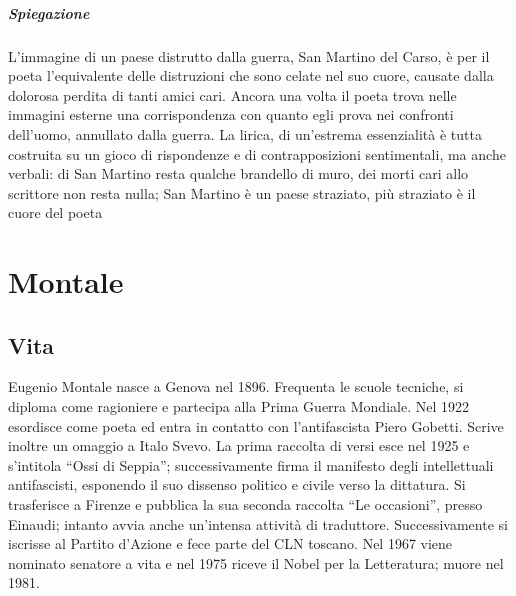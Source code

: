 \documentclass[10pt]{report}
\begin{document}
		\subparagraph[San Martino del carso]{Spiegazione} L’immagine di un paese distrutto dalla guerra, San Martino del Carso, è per il poeta l’equivalente delle distruzioni che sono celate nel suo cuore, causate dalla dolorosa perdita di tanti amici cari. Ancora una volta il poeta trova nelle immagini esterne una corrispondenza con quanto egli prova nei confronti dell’uomo, annullato dalla guerra. La lirica, di un’estrema essenzialità è tutta costruita su un gioco di rispondenze e di contrapposizioni sentimentali, ma anche verbali: di San Martino resta qualche brandello di muro, dei morti cari allo scrittore non resta nulla; San Martino è un paese straziato, più straziato è il cuore del poeta
		
		
		
		
		
		
	
		\section{Montale}
		\subsection{Vita}
		Eugenio Montale nasce a Genova nel 1896. Frequenta le scuole tecniche, si diploma come ragioniere e partecipa alla Prima Guerra Mondiale. Nel 1922 esordisce come poeta ed entra in contatto con l’antifascista Piero Gobetti. Scrive inoltre un omaggio a Italo Svevo. La prima raccolta di versi esce nel 1925 e s’intitola “Ossi di Seppia”; successivamente firma il manifesto degli intellettuali antifascisti, esponendo il suo dissenso politico e civile verso la dittatura. Si trasferisce a Firenze e pubblica la sua seconda raccolta “Le occasioni”, presso Einaudi; 
		intanto avvia anche un’intensa attività di traduttore. Successivamente si iscrisse al Partito d’Azione e fece parte del CLN toscano. Nel 1967 viene nominato senatore a vita e nel 1975 riceve il Nobel per la Letteratura; muore nel 1981.
		
\end{document}
